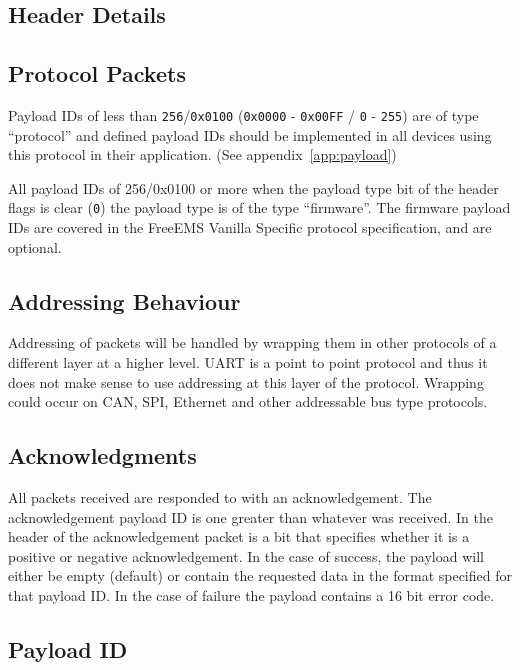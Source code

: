 \documentclass[12pt,a4wide,titlepage]{article}
\begin{document}
\begin{titlepage}
\begin{center}
\section{Header Details}

\subsection{Protocol Packets}

Payload IDs of less than \texttt{256}/\texttt{0x0100} (\texttt{0x0000} -
\texttt{0x00FF} / \texttt{0} - \texttt{255}) are of type ``protocol'' and
defined payload IDs should be implemented in all devices using this protocol in
their application. (See appendix~\ref{app:payload})

All payload IDs of 256/0x0100 or more when the payload type bit of the header
flags is clear (\texttt{0}) the payload type is of the type ``firmware''. The firmware
payload IDs are covered in the FreeEMS Vanilla Specific protocol specification,
and are optional.

\subsection{Addressing Behaviour}

Addressing of packets will be handled by wrapping them in other protocols of
a different layer at a higher level. UART is a point to point protocol and
thus it does not make sense to use addressing at this layer of the protocol.
Wrapping could occur on CAN, SPI, Ethernet and other addressable bus type
protocols.

\subsection{Acknowledgments}

All packets received are responded to with an acknowledgement. The
acknowledgement payload ID is one greater than whatever was received. In the
header of the acknowledgement packet is a bit that specifies whether it is a
positive or negative acknowledgement. In the case of success, the payload will
either be empty (default) or contain the requested data in the format specified
for that payload ID. In the case of failure the payload contains a 16 bit error
code.

\subsection{Payload ID}


\end{center}
\end{titlepage}
\end{document}
